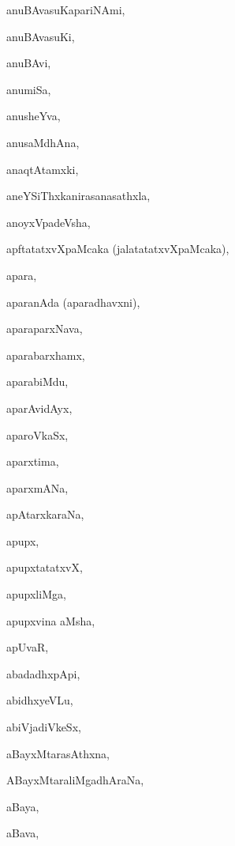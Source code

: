 \begin{multicols}{2}
{anuBAvasuKapariNAmi}, \pageref{anuBAvasuKapariNAmi}

{anuBAvasuKi}, \pageref{anuBAvasuKi}

{anuBAvi}, \pageref{anuBAvi}

{anumiSa}, \pageref{anumiSa}

{anusheYva}, \pageref{anusheYva}

{anusaMdhAna}, \pageref{anusaMdhAna}

{anaqtAtamxki}, \pageref{anaqtAtamxki}

{aneYSiThxkanirasanasathxla}, \pageref{aneYSiThxkanirasanasathxla}

{anoyxVpadeVsha}, \pageref{anoyxVpadeVsha}

{apftatatxvXpaMcaka (jalatatatxvXpaMcaka)}, \pageref{apftatatxvXpaMcaka (jalatatatxvXpaMcaka)}

{apara}, \pageref{apara}

{aparanAda (aparadhavxni)}, \pageref{aparanAda (aparadhavxni)}

{aparaparxNava}, \pageref{aparaparxNava}

{aparabarxhamx}, \pageref{aparabarxhamx}

{aparabiMdu}, \pageref{aparabiMdu}

{aparAvidAyx}, \pageref{aparAvidAyx}

{aparoVkaSx}, \pageref{aparoVkaSx}

{aparxtima}, \pageref{aparxtima}

{aparxmANa}, \pageref{aparxmANa}

{apAtarxkaraNa}, \pageref{apAtarxkaraNa}

{apupx}, \pageref{apupx}

{apupxtatatxvX}, \pageref{apupxtatatxvX}

{apupxliMga}, \pageref{apupxliMga}

{apupxvina aMsha}, \pageref{apupxvina aMsha}

{apUvaR}, \pageref{apUvaR}

{abadadhxpApi}, \pageref{abadadhxpApi}

{abidhxyeVLu}, \pageref{abidhxyeVLu}

{abiVjadiVkeSx}, \pageref{abiVjadiVkeSx}

{aBayxMtarasAthxna}, \pageref{aBayxMtarasAthxna}

{ABayxMtaraliMgadhAraNa}, \pageref{ABayxMtaraliMgadhAraNa}

{aBaya}, \pageref{aBaya}

{aBava}, \pageref{aBava}


\end{multicols}
